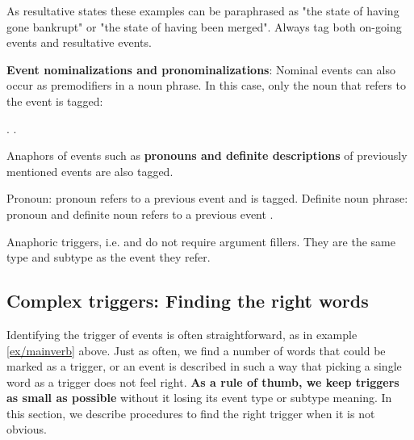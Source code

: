 As resultative states these examples can be paraphrased as "the state of having gone bankrupt" or "the state of having been merged".
Always tag both on-going events and resultative events.

\textbf{Event nominalizations and pronominalizations}:
Nominal events can also occur as premodifiers in a noun phrase.
In this case, only the noun that refers to the event is tagged:

\begin{exe}
    \ex {}
        \expl {}
    \ex {}.
        \expl {}
    \ex {}.
        \expl {}
\end{exe}

Anaphors of events such as \textbf{pronouns and definite descriptions} of previously mentioned events are also tagged.

\begin{exe}
    \ex\label{ex/pronoun1} Pronoun: 
        \expl pronoun  refers to a previous  event and is tagged.
    \ex\label{ex/pronoun2} Definite noun phrase: 
        \expl pronoun  and definite noun  refers to a previous event .
\end{exe}

Anaphoric triggers, i.e.  and  do not require argument fillers.
They are the same type and subtype as the event they refer.


\subsection{Complex triggers: Finding the right words}

Identifying the trigger of events is often straightforward, as in example \ref{ex/mainverb} above.
Just as often, we find a number of words that could be marked as a trigger, or an event is described in such a way that picking a single word as a trigger does not feel right.
\textbf{As a rule of thumb, we keep triggers as small as possible} without it losing its event type or subtype meaning.
In this section, we describe procedures to find the right trigger when it is not obvious.

